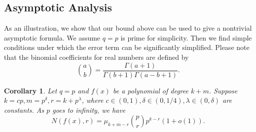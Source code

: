 \documentclass[reqno]{amsart}
\newtheorem{cor}[thm]{Corollary}
\theoremstyle{remark}
\numberwithin{equation}{section}
\begin{document}
\subsection{Asymptotic Analysis}
As an illustration, we show that our bound above can be used to give a nontrivial asymptotic formula.
We assume  $q=p$ is prime for simplicity.  Then we find simple conditions under which the error term can be significantly simplified.
Please note that the binomial
coefficients for real numbers are defined by $${a \choose b}=\frac{\Gamma{(a+1)}}{\Gamma{(b+1)}\Gamma{(a-b+1)}}.$$
\begin{cor} \label{Cor1.9}
 Let $q=p$ and $f(x)$ be a polynomial of degree $k+m$. Suppose $k=cp, m=p^{\delta}, r=k+p^\lambda$, where $c\in(0, 1), \delta\in(0, 1/4), \lambda\in(0, \delta)$ are constants. As $p$ goes to infinity,  we have
 $$N(f(x), r)=\mu_{k+m-r}{p \choose r}p^{k-r}(1+o(1)).$$
\end{cor}
\end{document}
